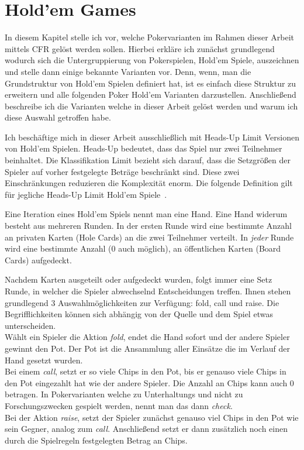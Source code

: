 \section{Hold'em Games}
In diesem Kapitel stelle ich vor, welche Pokervarianten im Rahmen dieser Arbeit mittels CFR gelöst werden sollen. 
Hierbei erkläre ich zunächst grundlegend wodurch sich die Untergruppierung von Pokerspielen, Hold'em Spiele, auszeichnen und stelle dann einige bekannte Varianten vor.
Denn, wenn, man die Grundstruktur von Hold'em Spielen definiert hat, ist es einfach diese Struktur zu erweitern und alle folgenden Poker Hold'em Varianten darzustellen.
Anschließend beschreibe ich die Varianten welche in dieser Arbeit gelöst werden und warum ich diese Auswahl getroffen habe. 

Ich beschäftige mich in dieser Arbeit ausschließlich mit Heads-Up Limit Versionen von Hold'em Spielen.
Heads-Up bedeutet, dass das Spiel nur zwei Teilnehmer beinhaltet. 
Die Klassifikation Limit bezieht sich darauf, dass die Setzgrößen der Spieler auf vorher festgelegte Beträge beschränkt sind.
Diese zwei Einschränkungen reduzieren die Komplexität enorm. 
Die folgende Definition gilt für jegliche Heads-Up Limit Hold'em Spiele~\cite{shi2001rhode}.

Eine Iteration eines Hold'em Spiels nennt man eine Hand.
Eine Hand widerum besteht aus mehreren Runden.
In der ersten Runde wird eine bestimmte Anzahl an privaten Karten (Hole Cards) an die zwei Teilnehmer verteilt.
In \emph{jeder} Runde wird eine bestimmte Anzahl (0 auch möglich), an öffentlichen Karten (Board Cards) aufgedeckt. 

Nachdem Karten ausgeteilt oder aufgedeckt wurden, folgt immer eine Setz Runde, in welcher die Spieler abwechselnd Entscheidungen treffen.
Ihnen stehen grundlegend 3 Auswahlmöglichkeiten zur Verfügung: \grqq fold, call und raise\glqq.
Die Begrifflichkeiten können sich abhängig von der Quelle und dem Spiel etwas unterscheiden.
\\
Wählt ein Spieler die Aktion \emph{fold}, endet die Hand sofort und der andere Spieler gewinnt den Pot.
Der Pot ist die Ansammlung aller Einsätze die im Verlauf der Hand gesetzt wurden.
\\
Bei einem \emph{call}, setzt er so viele Chips in den Pot, bis er genauso viele Chips in den Pot eingezahlt hat wie der andere Spieler.
Die Anzahl an Chips kann auch 0 betragen. 
In Pokervarianten welche zu Unterhaltungs und nicht zu Forschungszwecken gespielt werden, nennt man das dann \emph{check}. 
\\
Bei der Aktion \emph{raise}, setzt der Spieler zunächst genauso viel Chips in den Pot wie sein Gegner, analog zum \emph{call}.
Anschließend setzt er dann zusätzlich noch einen durch die Spielregeln festgelegten Betrag an Chips. 

